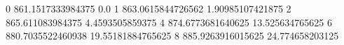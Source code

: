 0 861.1517333984375 0.0
1 863.0615844726562 1.90985107421875
2 865.611083984375 4.4593505859375
4 874.6773681640625 13.525634765625
6 880.7035522460938 19.55181884765625
8 885.9263916015625 24.774658203125
